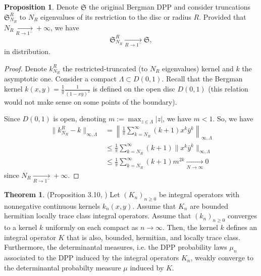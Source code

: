 \documentclass[11pt]{article}
\theoremstyle{plain}
\theoremstyle{definition}
\newtheorem{theorem}[definition]{Theorem}
\newtheorem{proposition}[definition]{Proposition}
\begin{document}
\begin{proposition} Denote $\mathfrak{S}$ the original Bergman DPP and consider truncations $ \mathfrak{S}_{N_R}^R $ to $ N_R $ eigenvalues of its restriction to the disc or radius $R$. Provided that $ N_R \xrightarrow[R \to 1^-]{} +\infty $, we have
\[
\mathfrak{S}_{N_R}^R \xrightarrow[R \to 1^-]{} \mathfrak{S},
\]
in distribution.
\end{proposition}

\begin{proof}
Denote $k_{N_R}^R$ the restricted-truncated (to $N_R$ eigenvalues) kernel and $k$ the asymptotic one. Consider a compact $\Lambda \subset D(0,1)$. Recall that the Bergman kernel $k(x,y) = \frac{1}{\pi}\frac{1}{(1-x\bar{y})^2}$ is defined on the open disc $D(0,1)$ (this relation would not make sense on some points of the boundary).

Since $D(0,1)$ is open, denoting $m := \max_{z \in \Lambda} |z|$, we have $m < 1$. So, we have
\begin{align*}
\|k_{N_R}^R - k\|_{\infty, \Lambda} &= \left\| \frac{1}{\pi} \sum_{k=N_R}^\infty (k+1) x^k \bar{y}^k \right\|_{\infty, \Lambda} \\
&\leqslant \frac{1}{\pi} \sum_{k=N_R}^\infty (k+1) \|x^k \bar{y}^k\|_{\infty, \Lambda} \\
&\leqslant \frac{1}{\pi} \sum_{k=N_R}^\infty (k+1) m^{2k} \xrightarrow[N \to \infty]{} 0
\end{align*}
since $ N_R \xrightarrow[R \to 1^-]{} +\infty $.
\end{proof}

\begin{theorem} \label{thm:cvg-in-law-dpp} (Proposition 3.10, \cite{ShiraiTakahashi2003})
Let $(K_n)_{n \ge 0}$ be integral operators with nonnegative continuous kernels $k_n(x,y)$. Assume that $K_n$ are bounded hermitian locally trace class integral operators. Assume that $(k_n)_{n \ge 0}$ converges to a kernel $k$ uniformly on each compact as $n \to \infty$. Then, the kernel $k$ defines an integral operator $K$ that is also, bounded, hermitian, and locally trace class. Furthermore, the determinantal measures, i.e. the DPP probability laws $\mu_n$ associated to the DPP induced by the integral operators $K_n$, weakly converge to the determinantal probabilty measure $\mu$ induced by $K$.
\end{theorem}
\end{document}
